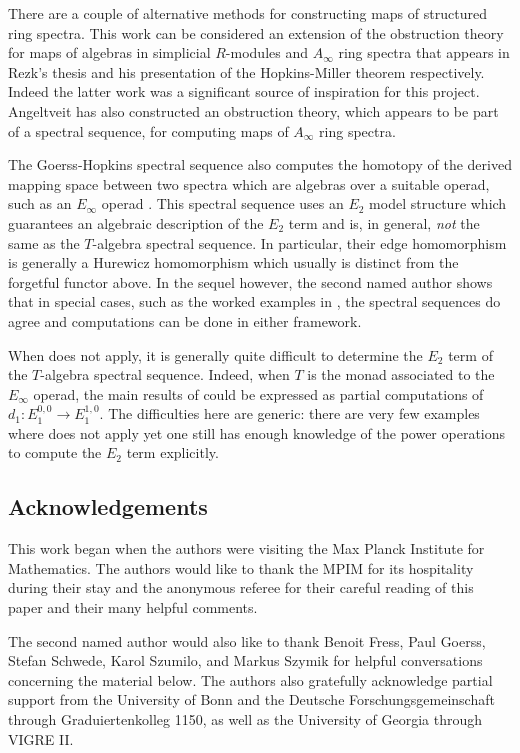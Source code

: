 \documentclass[leqno,oneside,english]{elsarticle}
\begin{document}
There are a couple of alternative methods for constructing maps of
structured ring spectra. This work can be considered an extension of the
obstruction theory for maps of algebras in simplicial $R$-modules and
$A_\infty$ ring spectra that appears in Rezk's thesis \cite{Rez96} and
his presentation of the Hopkins-Miller theorem \cite{Rez97} respectively. Indeed
the latter work was a significant source of inspiration for this
project. Angeltveit \cite{Ang08a} has also constructed an obstruction
theory, which appears to be part of a spectral sequence, for computing
maps of $A_\infty$ ring spectra. 

The Goerss-Hopkins spectral sequence also computes the homotopy of the
derived mapping space between two spectra which are algebras over a
suitable operad, such as an $E_\infty$ operad \cite{GoH04,
  GoH05}. This spectral sequence uses an $E_2$ model structure
which guarantees an algebraic description of the $E_2$ term and is,
in general, \emph{not} the same as the $T$-algebra spectral sequence. In
particular, their edge homomorphism is generally a Hurewicz homomorphism
which usually is distinct from the forgetful functor above. In the
sequel \cite{Noe14} however, the second named author shows that in
special cases, such as the worked examples in ,
the spectral sequences do agree and computations can be done in either
framework.

When  does not apply, it is generally quite
difficult to determine the $E_2$ term of the $T$-algebra spectral
sequence. Indeed, when $T$ is the monad associated to the $E_{\infty}$
operad, the main results of \cite{AHS04,And95,JoN09b} could be
expressed as partial computations of $d_1\colon E_{1}^{0,0}\rightarrow
E_1^{1,0}$.  The difficulties here are generic: there are very few
examples where  does not apply yet one still has enough knowledge of the power operations to
compute the $E_2$ term explicitly.

\subsection*{Acknowledgements}
This work began when the authors were visiting the Max Planck
Institute for Mathematics. The authors would like to thank the MPIM
for its hospitality during their stay and the anonymous referee for
their careful reading of this paper and their many helpful comments.

The second named author would also like to thank Benoit Fress, Paul
Goerss, Stefan Schwede, Karol Szumilo, and Markus Szymik for helpful
conversations concerning the material below. The authors also
gratefully acknowledge partial support from the University of Bonn and
the Deutsche Forschungsgemeinschaft through Graduiertenkolleg 1150, as
well as the University of Georgia through VIGRE II.
\end{document}
